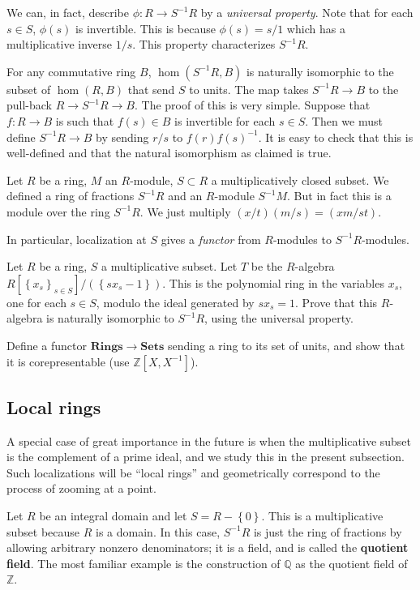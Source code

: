 We can, in fact, describe $\phi: R \to S^{-1}R$ by a \emph{universal
property}. Note
that for each $s \in S$, $\phi(s)$ is invertible.  This is because $\phi(s) =
s/1$ which has a multiplicative inverse $1/s$.  This property characterizes
$S^{-1}R$.

For any commutative ring $B$, $\hom(S^{-1}R, B)$ is naturally isomorphic to the
subset of $\hom(R,B)$ that send $S$ to units.  The map takes $S^{-1}R \to B$ to
the pull-back $R \to S^{-1}R \to B$.  The proof of this is very simple.
Suppose that $f: R \to B$ is such that $f(s) \in B$ is invertible for each $s
\in S$.  Then we must define $S^{-1}R \to B$ by sending $r/s$ to
$f(r)f(s)^{-1}$.  It is easy to check that this is well-defined and that the
natural isomorphism as claimed is true.

Let $R$ be a ring, $M$ an $R$-module, $S \subset R$ a multiplicatively closed
subset. We defined a ring of fractions $S^{-1}R$ and an $R$-module $S^{-1}M$.
But in fact this is a module over the ring $S^{-1}R$.
We just multiply $(x/t)(m/s) = (xm/st)$.

In particular, localization at $S$ gives a \emph{functor} from $R$-modules to
$S^{-1}R$-modules.

\begin{exercise}
Let $R$ be a ring, $S$ a multiplicative subset. Let $T$ be the $R$-algebra
$R[\left\{x_s\right\}_{s \in S}]/( \left\{sx_s - 1\right\})$. This is the
polynomial ring in the variables $x_s$, one for each $s \in S$, modulo the
ideal generated by $sx_s  = 1$. Prove that this $R$-algebra is naturally
isomorphic to $S^{-1}R$, using the universal property.
\end{exercise}

\begin{exercise} Define a functor $\mathbf{Rings} \to \mathbf{Sets}$ sending
a ring to
its set of units, and show that it is corepresentable (use $\mathbb{Z}[X,
X^{-1}]$).
\end{exercise}
\subsection{Local rings}

A special case of great importance in the future is when the multiplicative
subset is the complement of a prime ideal, and we study this in the present
subsection. Such localizations will be ``local rings'' and geometrically
correspond to the process of zooming at a point.

\begin{example}
Let $R$ be an integral domain and let $S = R - \left\{0\right\}$. This is a
multiplicative subset because $R$ is a domain.  In this case, $S^{-1}R$ is just
the ring of fractions by allowing arbitrary nonzero denominators; it is a
field, and is called the \textbf{quotient field}. The most familiar example is
the construction of $\mathbb{Q}$ as the quotient field of $\mathbb{Z}$.
\end{example}

